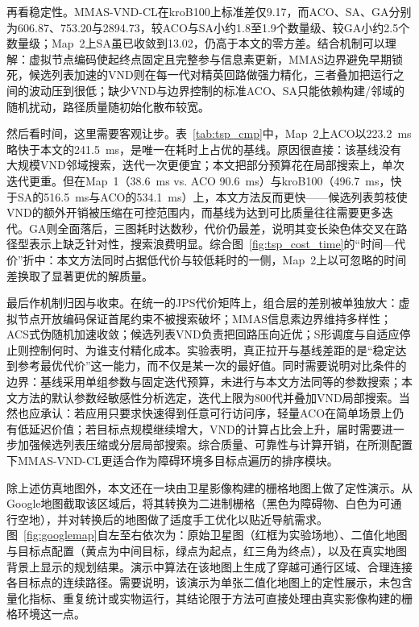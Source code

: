 \documentclass[lettersize,journal]{IEEEtran}
\begin{document}
再看稳定性。MMAS-VND-CL在kroB100上标准差仅9.17，而ACO、SA、GA分别为606.87、753.20与2894.73，较ACO与SA小约1.8至1.9个数量级、较GA小约2.5个数量级；Map~2上SA虽已收敛到13.02，仍高于本文的零方差。结合机制可以理解：虚拟节点编码使起终点固定且完整参与信息素更新，MMAS边界避免早期锁死，候选列表加速的VND则在每一代对精英回路做强力精化，三者叠加把运行之间的波动压到很低；缺少VND与边界控制的标准ACO、SA只能依赖构建/邻域的随机扰动，路径质量随初始化散布较宽。

然后看时间，这里需要客观让步。表~\textcolor{blue}{\ref{tab:tsp_cmp}}中，Map~2上ACO以223.2~ms略快于本文的241.5~ms，是唯一在耗时上占优的基线。原因很直接：该基线没有大规模VND邻域搜索，迭代一次更便宜；本文把部分预算花在局部搜索上，单次迭代更重。但在Map~1（38.6~ms vs. ACO 90.6~ms）与kroB100（496.7~ms，快于SA的516.5~ms与ACO的534.1~ms）上，本文方法反而更快——候选列表剪枝使VND的额外开销被压缩在可控范围内，而基线为达到可比质量往往需要更多迭代。GA则全面落后，三图耗时达数秒，代价仍最差，说明其变长染色体交叉在路径型表示上缺乏针对性，搜索浪费明显。综合图~\textcolor{blue}{\ref{fig:tsp_cost_time}}的“时间—代价”折中：本文方法同时占据低代价与较低耗时的一侧，Map~2上以可忽略的时间差换取了显著更优的解质量。

最后作机制归因与收束。在统一的JPS代价矩阵上，组合层的差别被单独放大：虚拟节点开放编码保证首尾约束不被搜索破坏；MMAS信息素边界维持多样性；ACS式伪随机加速收敛；候选列表VND负责把回路压向近优；S形调度与自适应停止则控制何时、为谁支付精化成本。实验表明，真正拉开与基线差距的是“稳定达到参考最优代价”这一能力，而不仅是某一次的最好值。同时需要说明对比条件的边界：基线采用单组参数与固定迭代预算，未进行与本文方法同等的参数搜索；本文方法的默认参数经敏感性分析选定，迭代上限为800代并叠加VND局部搜索。当然也应承认：若应用只要求快速得到任意可行访问序，轻量ACO在简单场景上仍有低延迟价值；若目标点规模继续增大，VND的计算占比会上升，届时需要进一步加强候选列表压缩或分层局部搜索。综合质量、可靠性与计算开销，在所测配置下MMAS-VND-CL更适合作为障碍环境多目标点遍历的排序模块。

除上述仿真地图外，本文还在一块由卫星影像构建的栅格地图上做了定性演示。从Google地图截取该区域后，将其转换为二进制栅格（黑色为障碍物、白色为可通行空地），并对转换后的地图做了适度手工优化以贴近导航需求。图~\textcolor{blue}{\ref{fig:googlemap}}自左至右依次为：原始卫星图（红框为实验场地）、二值化地图与目标点配置（黄点为中间目标，绿点为起点，红三角为终点），以及在真实地图背景上显示的规划结果。演示中算法在该地图上生成了穿越可通行区域、合理连接各目标点的连续路径。需要说明，该演示为单张二值化地图上的定性展示，未包含量化指标、重复统计或实物运行，其结论限于方法可直接处理由真实影像构建的栅格环境这一点。
\end{document}
